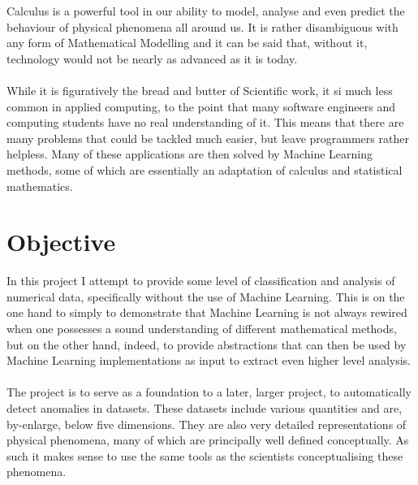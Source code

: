 \documentclass[main.tex]{subfiles}
\begin{document}
  
  Calculus is a powerful tool in our ability to model, analyse and even predict the behaviour of physical phenomena all around us. It is rather disambiguous with any form of Mathematical Modelling and it can be said that, without it, technology would not be nearly as advanced as it is today.
  \\\\
  While it is figuratively the bread and butter of Scientific work, it si much less common in applied computing, to the point that many software engineers and computing students have no real understanding of it. This means that there are many problems that could be tackled much easier, but leave programmers rather helpless. Many of these applications are then solved by Machine Learning methods, some of which are essentially an adaptation of calculus and statistical mathematics. 

  \section{Objective}
    
    In this project I attempt to provide some level of classification and analysis of numerical data, specifically without the use of Machine Learning. This is on the one hand to simply to demonstrate that Machine Learning is not always rewired when one possesses a sound understanding of different mathematical methods, but on the other hand, indeed, to provide abstractions that can then be used by Machine Learning implementations as input to extract even higher level analysis.
    \\\\
    The project is to serve as a foundation to a later, larger project, to automatically detect anomalies in datasets. These datasets include various quantities and are, by-enlarge, below five dimensions. They are also very detailed representations of physical phenomena, many of which are principally well defined conceptually. As such it makes sense to use the same tools as the scientists conceptualising these phenomena. 
    
\end{document}

